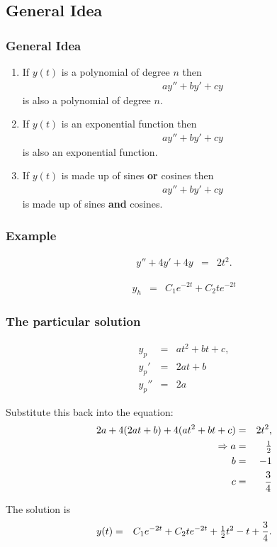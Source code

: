 \subsection{General Idea}

\begin{frame}
  \frametitle{General Idea}

  \begin{enumerate}
  \item If $y(t)$ is a polynomial of degree $n$ then
    \begin{eqnarray*}
      a y'' + b y' + cy 
    \end{eqnarray*}
    is also a polynomial of degree $n$.
  \item If $y(t)$ is an exponential function then
    \begin{eqnarray*}
      a y'' + by' + cy 
    \end{eqnarray*}
    is also an exponential function.
  \item If $y(t)$ is made up of sines \textbf{or} cosines then
    \begin{eqnarray*}
      a y'' + by' + cy
    \end{eqnarray*}
    is  made up of sines \textbf{and} cosines.
  \end{enumerate}

\end{frame}


\begin{frame}
  \frametitle{Example}

  \begin{eqnarray*}
    y'' + 4y' + 4y & = & 2t^2.
  \end{eqnarray*}

  {
    \begin{eqnarray*}
      y_h & = & C_1 e^{-2t} + C_2 t e^{-2t}
    \end{eqnarray*}
  }

\end{frame}


\begin{frame}
  \frametitle{The particular solution}

  \begin{eqnarray*}
    y_p & = & at^2 + bt + c, \\
    y_p' & = & 2at + b \\
    y_p'' & = & 2a
  \end{eqnarray*}

  Substitute this back into the equation:
  \begin{eqnarray*}
    2a + 4 (2at+b) + 4 (at^2 + bt + c) & = & 2t^2, \\
    \Rightarrow 
    a & = & \mbox{$\frac{1}{2}$} \\
    b & = & -1 \\
    c & = & \frac{3}{4}
  \end{eqnarray*}

  The solution is 
  \begin{eqnarray*}
    y(t) & = & C_1 e^{-2t} + C_2 t e^{-2t} + \mbox{$\frac{1}{2}$} t^2 - t + \frac{3}{4}.
  \end{eqnarray*}

\end{frame}


